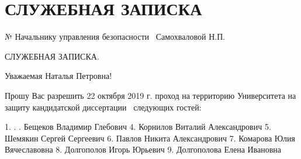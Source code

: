 

\section{СЛУЖЕБНАЯ ЗАПИСКА}


№	Начальнику управления безопасности
\thesisOrganizationShort\
Самохваловой Н.П.

СЛУЖЕБНАЯ ЗАПИСКА.

Уважаемая Наталья Петровна!

Прошу Вас разрешить 22 октября 2019 г. проход на территорию Университета на защиту кандидатской диссертации \thesisAuthorLastNameFrom\ следующих гостей:

1.	.	.	Бещеков Владимир Глебович
4.	Корнилов Виталий Александрович
5.	Шемякин Сергей Сергеевич
6.	Павлов Никита Александрович
7.	Комарова Юлия Вячеславовна
8.	Долгополов Игорь Юрьевич
9.	Долгополова Елена Ивановна


\clearpage